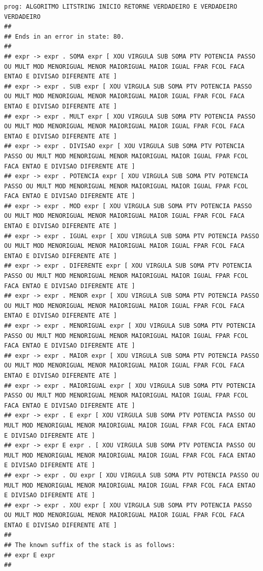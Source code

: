 \documentclass[hidelinks,12pt]{article}
\begin{document}
\begin{lstlisting}
prog: ALGORITMO LITSTRING INICIO RETORNE VERDADEIRO E VERDADEIRO VERDADEIRO 
##
## Ends in an error in state: 80.
##
## expr -> expr . SOMA expr [ XOU VIRGULA SUB SOMA PTV POTENCIA PASSO OU MULT MOD MENORIGUAL MENOR MAIORIGUAL MAIOR IGUAL FPAR FCOL FACA ENTAO E DIVISAO DIFERENTE ATE ]
## expr -> expr . SUB expr [ XOU VIRGULA SUB SOMA PTV POTENCIA PASSO OU MULT MOD MENORIGUAL MENOR MAIORIGUAL MAIOR IGUAL FPAR FCOL FACA ENTAO E DIVISAO DIFERENTE ATE ]
## expr -> expr . MULT expr [ XOU VIRGULA SUB SOMA PTV POTENCIA PASSO OU MULT MOD MENORIGUAL MENOR MAIORIGUAL MAIOR IGUAL FPAR FCOL FACA ENTAO E DIVISAO DIFERENTE ATE ]
## expr -> expr . DIVISAO expr [ XOU VIRGULA SUB SOMA PTV POTENCIA PASSO OU MULT MOD MENORIGUAL MENOR MAIORIGUAL MAIOR IGUAL FPAR FCOL FACA ENTAO E DIVISAO DIFERENTE ATE ]
## expr -> expr . POTENCIA expr [ XOU VIRGULA SUB SOMA PTV POTENCIA PASSO OU MULT MOD MENORIGUAL MENOR MAIORIGUAL MAIOR IGUAL FPAR FCOL FACA ENTAO E DIVISAO DIFERENTE ATE ]
## expr -> expr . MOD expr [ XOU VIRGULA SUB SOMA PTV POTENCIA PASSO OU MULT MOD MENORIGUAL MENOR MAIORIGUAL MAIOR IGUAL FPAR FCOL FACA ENTAO E DIVISAO DIFERENTE ATE ]
## expr -> expr . IGUAL expr [ XOU VIRGULA SUB SOMA PTV POTENCIA PASSO OU MULT MOD MENORIGUAL MENOR MAIORIGUAL MAIOR IGUAL FPAR FCOL FACA ENTAO E DIVISAO DIFERENTE ATE ]
## expr -> expr . DIFERENTE expr [ XOU VIRGULA SUB SOMA PTV POTENCIA PASSO OU MULT MOD MENORIGUAL MENOR MAIORIGUAL MAIOR IGUAL FPAR FCOL FACA ENTAO E DIVISAO DIFERENTE ATE ]
## expr -> expr . MENOR expr [ XOU VIRGULA SUB SOMA PTV POTENCIA PASSO OU MULT MOD MENORIGUAL MENOR MAIORIGUAL MAIOR IGUAL FPAR FCOL FACA ENTAO E DIVISAO DIFERENTE ATE ]
## expr -> expr . MENORIGUAL expr [ XOU VIRGULA SUB SOMA PTV POTENCIA PASSO OU MULT MOD MENORIGUAL MENOR MAIORIGUAL MAIOR IGUAL FPAR FCOL FACA ENTAO E DIVISAO DIFERENTE ATE ]
## expr -> expr . MAIOR expr [ XOU VIRGULA SUB SOMA PTV POTENCIA PASSO OU MULT MOD MENORIGUAL MENOR MAIORIGUAL MAIOR IGUAL FPAR FCOL FACA ENTAO E DIVISAO DIFERENTE ATE ]
## expr -> expr . MAIORIGUAL expr [ XOU VIRGULA SUB SOMA PTV POTENCIA PASSO OU MULT MOD MENORIGUAL MENOR MAIORIGUAL MAIOR IGUAL FPAR FCOL FACA ENTAO E DIVISAO DIFERENTE ATE ]
## expr -> expr . E expr [ XOU VIRGULA SUB SOMA PTV POTENCIA PASSO OU MULT MOD MENORIGUAL MENOR MAIORIGUAL MAIOR IGUAL FPAR FCOL FACA ENTAO E DIVISAO DIFERENTE ATE ]
## expr -> expr E expr . [ XOU VIRGULA SUB SOMA PTV POTENCIA PASSO OU MULT MOD MENORIGUAL MENOR MAIORIGUAL MAIOR IGUAL FPAR FCOL FACA ENTAO E DIVISAO DIFERENTE ATE ]
## expr -> expr . OU expr [ XOU VIRGULA SUB SOMA PTV POTENCIA PASSO OU MULT MOD MENORIGUAL MENOR MAIORIGUAL MAIOR IGUAL FPAR FCOL FACA ENTAO E DIVISAO DIFERENTE ATE ]
## expr -> expr . XOU expr [ XOU VIRGULA SUB SOMA PTV POTENCIA PASSO OU MULT MOD MENORIGUAL MENOR MAIORIGUAL MAIOR IGUAL FPAR FCOL FACA ENTAO E DIVISAO DIFERENTE ATE ]
##
## The known suffix of the stack is as follows:
## expr E expr 
##


\end{lstlisting}
\end{document}
